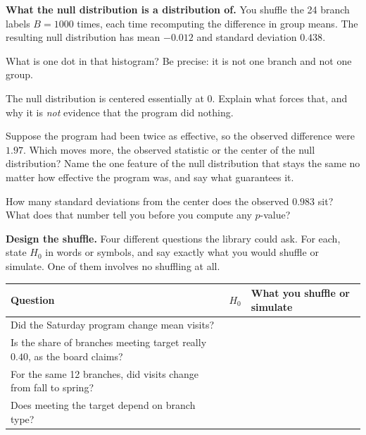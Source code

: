 \documentclass[11pt]{article}
\newcommand{\answerspace}[1]{\vspace{#1}}
\begin{document}
\begin{questions}

\item \textbf{What the null distribution is a distribution of.} You shuffle the 24 branch labels
$B = 1000$ times, each time recomputing the difference in group means. The resulting null
distribution has mean $-0.012$ and standard deviation $0.438$.

\begin{parts}
\item What is one dot in that histogram? Be precise: it is not one branch and not one group.
\answerspace{3.5em}

\item The null distribution is centered essentially at $0$. Explain what forces that, and why it
is \emph{not} evidence that the program did nothing.
\answerspace{4em}

\item Suppose the program had been twice as effective, so the observed difference were $1.97$.
Which moves more, the observed statistic or the center of the null distribution? Name the one
feature of the null distribution that stays the same no matter how effective the program was, and
say what guarantees it.
\answerspace{4.5em}

\item How many standard deviations from the center does the observed $0.983$ sit? What does that
number tell you before you compute any $p$-value?
\answerspace{3.5em}
\end{parts}

\item \textbf{Design the shuffle.} Four different questions the library could ask. For each, state
$H_0$ in words or symbols, and say exactly what you would shuffle or simulate. One of them involves
no shuffling at all.

\begin{center}
\renewcommand{\arraystretch}{2.2}
\begin{tabularx}{\linewidth}{LLL}
\toprule
\textbf{Question} & \textbf{$H_0$} & \textbf{What you shuffle or simulate} \\
\midrule
Did the Saturday program change mean visits? & & \\
Is the share of branches meeting target really $0.40$, as the board claims? & & \\
For the same 12 branches, did visits change from fall to spring? & & \\
Does meeting the target depend on branch type? & & \\
\bottomrule
\end{tabularx}
\end{center}


\end{questions}
\end{document}
